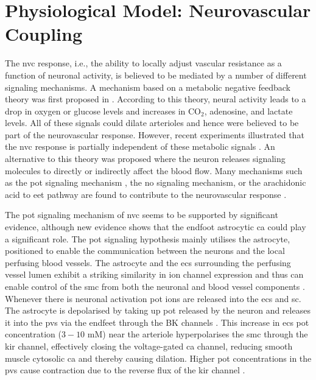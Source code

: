 \documentclass[smallextended]{svjour3}
\numberwithin{equation}{section}
\begin{document}
\section{Physiological Model: Neurovascular Coupling}\label{sec:model}
The \gls{nvc} response, i.e., the ability to locally adjust vascular resistance as a function of neuronal activity, is believed to be mediated by a number of different signaling mechanisms. A  mechanism based on a metabolic negative feedback theory was first proposed in \cite{Roy1890}. According to this theory, neural activity leads to a drop in oxygen or glucose levels and increases in CO$_2$, adenosine, and lactate levels. All of these signals could dilate arterioles and hence were believed to be part of the neurovascular response. However, recent experiments illustrated that the \gls{nvc} response is partially independent of these metabolic signals \cite{Leithner2010, Lindauer2010, Mintun2001, Powers1996, Makani2010}. An alternative to this theory was proposed where the neuron releases signaling molecules to directly or indirectly affect the blood flow. Many mechanisms such as the \gls{pot} signaling mechanism \cite{Filosa2006}, the \gls{no} signaling mechanism, or the arachidonic acid to \gls{eet} pathway are found to contribute to the neurovascular response \cite{Attwell2010}.

The \gls{pot} signaling mechanism of \gls{nvc} seems to be supported by significant evidence, although new evidence shows that the endfoot astrocytic \gls{ca} could play a significant role. The \gls{pot} signaling hypothesis mainly utilises the astrocyte,  positioned to enable the communication between the neurons and the local perfusing blood vessels. The astrocyte and the \glspl{ec} surrounding the perfusing vessel lumen exhibit a striking similarity in ion channel expression and thus can enable control of the \gls{smc} from both the neuronal and blood vessel components \cite{Longden2015}. Whenever there is neuronal activation \gls{pot} ions are released into the \gls{ecs} and \gls{sc}. The astrocyte is depolarised by taking up \gls{pot} released by the neuron and releases it into the \gls{pvs} via the endfeet through the BK channels \citep{Filosa2007}. This increase in \gls{ecs} \gls{pot} concentration ($3-10$ mM) near the arteriole hyperpolarises the \gls{smc} through the \gls{kir} channel, effectively closing the voltage-gated \gls{ca} channel, reducing smooth muscle cytosolic \gls{ca} and thereby causing dilation. Higher \gls{pot} concentrations in the \gls{pvs} cause contraction due to the reverse flux of the \gls{kir} channel \citep{Farr2011}. 
\end{document}
